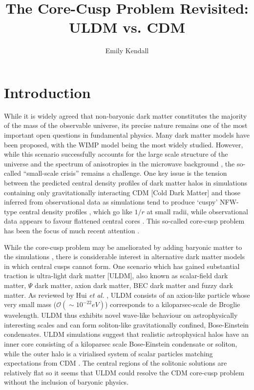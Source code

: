 \documentclass[a4paper,11pt]{article}
\title{\boldmath The Core-Cusp Problem Revisited: ULDM vs. CDM}
\author[1]{Emily Kendall}
\affiliation[1]{Department of Physics, University of Auckland, Private Bag 92019, Auckland, New Zealand}
\begin{document}
\maketitle
\flushbottom


\section{Introduction}\label{sec:intro}

While it is widely agreed that non-baryonic dark matter constitutes the majority of the mass of the observable universe, its precise nature remains one of the most important open questions in fundamental physics. Many dark matter models have been proposed, with the WIMP model being the most widely studied. However, while this scenario successfully accounts for the large scale structure of the universe \cite{Springel:2005nw} and the spectrum of anisotropies in the microwave background \cite{deBernardis:2000sbo, Hanany:2000qf, Halverson:2001yy, Netterfield:2001yq, Lee:2001yp, Ade:2015xua,  Hu:2001bc}, the so-called ``small-scale crisis'' \cite{Weinberg:2013aya} remains a challenge. One key issue is the tension between the predicted central density profiles of dark matter halos in simulations containing only gravitationally interacting CDM [Cold Dark Matter] and those inferred from observational data as simulations tend to produce `cuspy' NFW-type central density profiles \cite{Navarro:1995iw}, which go like $1/r$ at small radii, while observational data appears to favour flattened central cores \cite{Moore:1994yx} . This so-called core-cusp problem has been the focus of much recent attention \cite{Dutton:2018nop, Read:2018pft, Genina:2018}. 

While the core-cusp problem may be ameliorated by adding baryonic matter to the simulations  \cite{Benitez-Llambay:2018}, there is considerable interest in alternative dark matter models in which central cusps cannot form.  One scenario which has gained substantial traction is ultra-light dark matter [ULDM], also known as scalar-field dark matter, $\Psi$ dark matter, axion dark matter, BEC dark matter and fuzzy dark matter. As reviewed by Hui {\em et al.\/} \cite{Hui:2016ltb}, ULDM consists of an axion-like particle whose very small mass  ($\mathcal{O}(\sim 10^{-22}eV)$) corresponds to a kiloparsec-scale de Broglie wavelength.  ULDM thus exhibits novel wave-like behaviour on astrophysically interesting scales and can form soliton-like gravitationally confined, Bose-Einstein condensates. ULDM simulations suggest that realistic astrophysical halos have an inner core consisting of a kiloparsec scale Bose-Einstein condensate or soliton, while the outer halo is a virialised system of scalar particles  matching expectations from CDM \cite{Schwabe:2016rze, Veltmaat:2018dfz}. The central regions of the solitonic solutions are relatively flat so it seems that ULDM could  resolve the CDM core-cusp problem without the inclusion of baryonic physics. 
\end{document}
